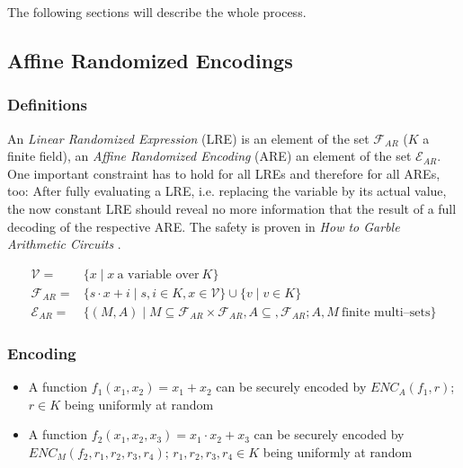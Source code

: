 \documentclass[12pt, a4paper]{article}
\begin{document}
\noindent{}The following sections will describe the whole process.


\subsection{Affine Randomized Encodings}
\label{sec:affinization-gadget}

\subsubsection{Definitions}
\label{sec:affinization_definitions}

An \emph{Linear Randomized Expression} (LRE) is an element of the set
$\mathcal{F}_{AR}$ ($K$ a finite field), an \emph{Affine Randomized Encoding}
(ARE) an element of the set $\mathcal{E}_{AR}$. One important constraint has to
hold for all LREs and therefore for all AREs, too: After fully evaluating a LRE,
i.e. replacing the variable by its actual value, the now constant LRE should
reveal no more information that the result of a full decoding of the respective
ARE. The safety is proven in \emph{How to Garble Arithmetic Circuits}
\cite{gac2012}.

\begin{align*}
  \mathcal{V} = & \{ x \mid x~\text{a variable over}~K \} \\
%
  \mathcal{F}_{AR} = & \{ s \cdot x + i \mid s, i \in K, x \in \mathcal{V} \}
  \cup \{ v \mid v \in K \} \\
%
  \mathcal{E}_{AR} = & \{ (M, A) \mid
    M \subseteq \mathcal{F}_{AR} \times \mathcal{F}_{AR},
    A \subseteq, \mathcal{F}_{AR};
    A, M~\text{finite multi--sets} \}
%
\end{align*}


\subsubsection{Encoding}
\label{sec:affinization_encoding}

\begin{itemize}

\item A function $f_1(x_1, x_2) = x_1 + x_2$ can be securely encoded by
$ENC_A(f_1, r)$; $r \in K$ being uniformly at random

\item A function $f_2(x_1, x_2, x_3) = x_1 \cdot x_2 + x_3$ can be securely
encoded by $ENC_M(f_2, r_1, r_2, r_3, r_4)$; $r_1, r_2, r_3, r_4 \in K$ being
uniformly at random
\end{itemize}
\end{document}
